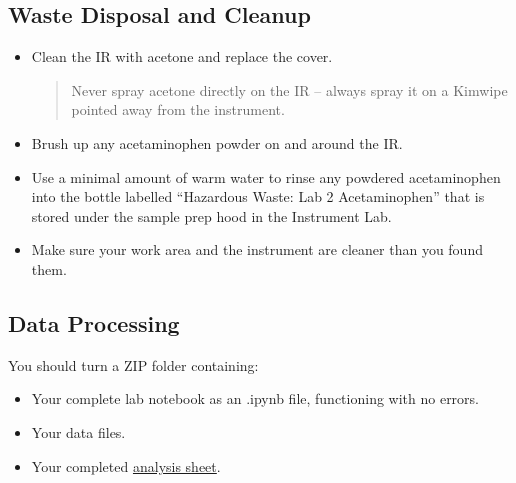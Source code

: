 \documentclass[]{tufte-book}
\providecommand{\tightlist}{%
  \setlength{\itemsep}{0pt}\setlength{\parskip}{0pt}}
\begin{document}
\hypertarget{waste-disposal-and-cleanup-2}{%
\subsection{Waste Disposal and Cleanup}\label{waste-disposal-and-cleanup-2}}

\begin{itemize}
\item
  Clean the IR with acetone and replace the cover.

  \begin{quote}
  Never spray acetone directly on the IR -- always spray it on a Kimwipe pointed away from the instrument.
  \end{quote}
\item
  Brush up any acetaminophen powder on and around the IR.
\item
  Use a minimal amount of warm water to rinse any powdered acetaminophen into the bottle labelled ``Hazardous Waste: Lab 2 Acetaminophen'' that is stored under the sample prep hood in the Instrument Lab.
\item
  Make sure your work area and the instrument are cleaner than you found them.
\end{itemize}

\hypertarget{data-processing-3}{%
\subsection{Data Processing}\label{data-processing-3}}

\begin{marginfigure}
You should turn a ZIP folder containing:

\begin{itemize}
\tightlist
\item
  Your complete lab notebook as an .ipynb file, functioning with no
  errors.\\
\item
  Your data files.\\
\item
  Your completed
  \href{https://github.com/alphonse/alphonse.github.io/raw/master/devel/chem370/assignments/excel-templates/rotation_ftir_data-analysis.xlsx}{analysis
  sheet}.
\end{itemize}
\end{marginfigure}
\end{document}

